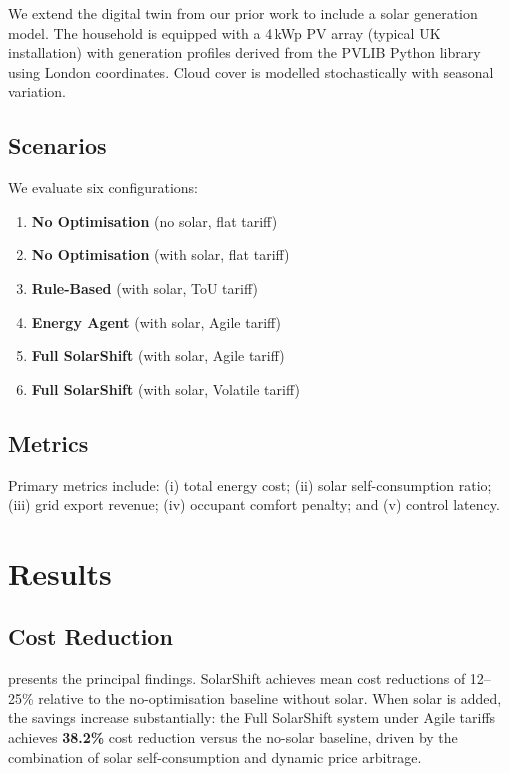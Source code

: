 \documentclass[11pt,a4paper]{article}
\begin{document}
We extend the digital twin from our prior work to include a solar generation model. The household is equipped with a 4\,kWp PV array (typical UK installation) with generation profiles derived from the PVLIB Python library using London coordinates. Cloud cover is modelled stochastically with seasonal variation.

\subsection{Scenarios}

We evaluate six configurations:
\begin{enumerate}
    \item \textbf{No Optimisation} (no solar, flat tariff)
    \item \textbf{No Optimisation} (with solar, flat tariff)
    \item \textbf{Rule-Based} (with solar, ToU tariff)
    \item \textbf{Energy Agent} (with solar, Agile tariff)
    \item \textbf{Full SolarShift} (with solar, Agile tariff)
    \item \textbf{Full SolarShift} (with solar, Volatile tariff)
\end{enumerate}

\subsection{Metrics}

Primary metrics include: (i) total energy cost; (ii) solar self-consumption ratio; (iii) grid export revenue; (iv) occupant comfort penalty; and (v) control latency.

\section{Results}
\label{sec:results}

\subsection{Cost Reduction}

 presents the principal findings. SolarShift achieves mean cost reductions of 12--25\% relative to the no-optimisation baseline without solar. When solar is added, the savings increase substantially: the Full SolarShift system under Agile tariffs achieves \textbf{38.2\%} cost reduction versus the no-solar baseline, driven by the combination of solar self-consumption and dynamic price arbitrage.
\end{document}
